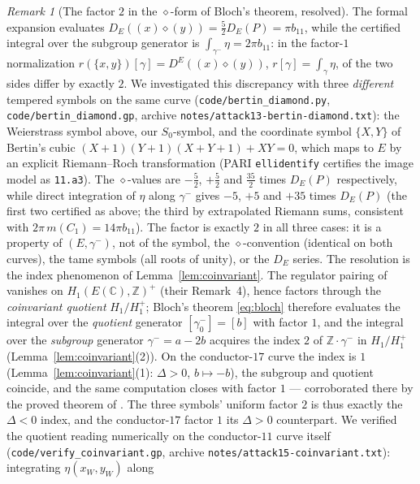 \documentclass[preprint,12pt]{elsarticle}
\theoremstyle{definition}
\theoremstyle{remark}
\newtheorem{remark}[theorem]{Remark}
\newcommand{\Z}{\mathbb{Z}}
\newcommand{\C}{\mathbb{C}}
\begin{document}
\begin{remark}[The factor $2$ in the $\diamond$-form of Bloch's theorem,
resolved]\label{rem:diamondk0}
The formal expansion evaluates
$D_E((x)\diamond(y))=\frac52D_E(P)=\pi b_{11}$, while the certified integral
over the subgroup generator is $\int_{\gamma^-}\eta=2\pi b_{11}$: in the
factor-$1$ normalization $r(\{x,y\})[\gamma]=D^E((x)\diamond(y))$,
$r[\gamma]=\int_\gamma\eta$, of \cite[Thm.~6]{LalinRam} the two sides differ
by exactly $2$. We investigated this discrepancy with three \emph{different}
tempered symbols on the same curve (\texttt{code/bertin\_diamond.py},
\texttt{code/bertin\_diamond.gp}, archive
\texttt{notes/attack13-bertin-diamond.txt}): the Weierstrass symbol above,
our $S_0$-symbol, and the coordinate symbol $\{X,Y\}$ of Bertin's cubic
$(X+1)(Y+1)(X+Y+1)+XY=0$, which maps to $E$ by an explicit Riemann--Roch
transformation (PARI \texttt{ellidentify} certifies the image model as
\texttt{11.a3}). The $\diamond$-values are $-\frac52$, $+\frac52$ and
$\frac{35}{2}$ times $D_E(P)$ respectively, while direct integration of
$\eta$ along $\gamma^-$ gives $-5$, $+5$ and $+35$ times $D_E(P)$ (the first
two certified as above; the third by extrapolated Riemann sums, consistent
with $2\pi\,m(C_1)=14\pi b_{11}$). The factor is exactly $2$ in all three
cases: it is a property of $(E,\gamma^-)$, not of the symbol, the
$\diamond$-convention (identical on both curves), the tame symbols (all
roots of unity), or the $D_E$ series.
The resolution is the index phenomenon of Lemma~\ref{lem:coinvariant}. The
regulator pairing of \cite[Def.~3]{LalinRam} vanishes on $H_1(E(\C),\Z)^+$
(their Remark~4), hence factors through the \emph{coinvariant quotient}
$H_1/H_1^+$; Bloch's theorem \eqref{eq:bloch} therefore evaluates the
integral over the \emph{quotient} generator $[\gamma^-_0]=[b]$ with
factor $1$, and the integral over the \emph{subgroup} generator
$\gamma^-=a-2b$ acquires the index $2$ of $\Z\cdot\gamma^-$ in $H_1/H_1^+$
(Lemma~\ref{lem:coinvariant}(2)). On the conductor-$17$ curve the index is
$1$ (Lemma~\ref{lem:coinvariant}(1): $\Delta>0$, $b\mapsto-b$), the subgroup
and quotient coincide, and the same computation closes with factor $1$ ---
corroborated there by the proved theorem of \cite{LalinRam}. The three
symbols' uniform factor $2$ is thus exactly the $\Delta<0$ index, and the
conductor-$17$ factor $1$ its $\Delta>0$ counterpart.
We verified the quotient reading numerically on the conductor-$11$ curve
itself (\texttt{code/verify\_coinvariant.gp}, archive
\texttt{notes/attack15-coinvariant.txt}): integrating $\eta(x_W,y_W)$ along

\end{remark}
\end{document}
